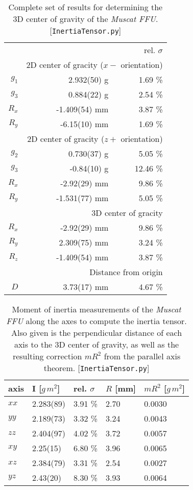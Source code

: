 \documentclass[journal]{IEEEtran}
\begin{document}
\begin{table}
	\centering
	\begin{tabular}{r | r r}
		\multicolumn{3}{r}{rel. $\sigma$} \\
		& \multicolumn{2}{r}{2D center of gracity ($x-$ orientation)} \\
		\hline
		$g_{1}$	& 2.932(50) g	& 1.69 \% \\
		$g_{3}$	& 0.884(22) g	& 2.54 \% \\
		$R_x$	& -1.409(54) mm	& 3.87 \% \\
		$R_y$	& -6.15(10) mm	& 1.69 \% \\
		& \multicolumn{2}{r}{2D center of gracity ($z+$ orientation)} \\
		\hline
		$g_2$	& 0.730(37) g	& 5.05 \% \\
		$g_3$	& -0.84(10) g	& 12.46 \% \\
		$R_x$	& -2.92(29) mm	& 9.86 \% \\
		$R_y$	& -1.531(77) mm	& 5.05 \% \\
		& \multicolumn{2}{r}{3D center of gracity} \\
		\hline
		$R_x$	& -2.92(29) mm	& 9.86 \% \\
		$R_y$	& 2.309(75) mm	& 3.24 \% \\
		$R_z$	& -1.409(54) mm	& 3.87 \% \\
		& \multicolumn{2}{r}{Distance from origin} \\
		\hline
		$D$	& 3.73(17) mm	& 4.67 \% \\
	\end{tabular}
	\caption{Complete set of results for determining the 3D center of gravity of the \emph{Muscat FFU}. [\texttt{InertiaTensor.py}]}
	\label{tab:FFUCoG}
\end{table}

\begin{table}
	\centering
	\begin{tabular}{l | l l l l}
		axis	& I [$\unit{g\,m^2}$]		& rel. $\sigma$ & $R$ [mm]		& $m R^2$ [$\unit{g\,m^2}$] \\
		\hline
		$xx$	& 2.283(89) & 3.91 \%	& 2.70	& 0.0030 \\
		$yy$	& 2.189(73) & 3.32 \% 	& 3.24	& 0.0043 \\
		$zz$	& 2.404(97) & 4.02 \% 	& 3.72	& 0.0057 \\
		$xy$	& 2.25(15) & 6.80 \% 	& 3.96	& 0.0065 \\
		$xz$	& 2.384(79) & 3.31 \%	& 2.54	& 0.0027 \\
		$yz$	& 2.43(20) & 8.30 \%	& 3.93	& 0.0064 \\
	\end{tabular}
	\caption{Moment of inertia measurements of the \emph{Muscat FFU} along the axes to compute the inertia tensor. Also given is the perpendicular distance of each axis to the 3D center of gravity, as well as the resulting correction $mR^2$ from the parallel axis theorem. [\texttt{InertiaTensor.py}]}
	\label{tab:FFUI}
\end{table}
\end{document}
